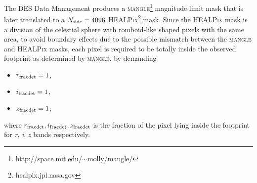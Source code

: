 The DES Data Management \cite{2011arXiv1109.6741S,2012ApJ...757...83D,2012SPIE.8451E..0DM} produces a {\scshape mangle}\footnote{http://space.mit.edu/$\sim$molly/mangle/} \cite{2008MNRAS.387.1391S}  magnitude limit mask that is later translated to a $N_{\rm side}=4096$ {\scshape HEALPix}\footnote{healpix.jpl.nasa.gov} \cite{2005ApJ...622..759G} mask. Since the {\scshape HEALPix} mask is a division of the celestial sphere with romboid-like shaped pixels with the same area, to avoid boundary effects due to the possible mismatch between the {\scshape mangle} and {\scshape HEALPix} masks, each pixel is required to be totally inside the observed footprint as determined by {\scshape mangle}, by demanding
\begin{itemize}
	\item $r_{\rm fracdet}=1$,
	\item $i_{\rm fracdet}=1$,
	\item $z_{\rm fracdet}=1$;
\end{itemize}
where $r_{\rm fracdet},i_{\rm fracdet},z_{\rm fracdet}$ is the fraction of the pixel lying inside the footprint for {\it r}, {\it i}, {\it z} bands respectively.
\newline

